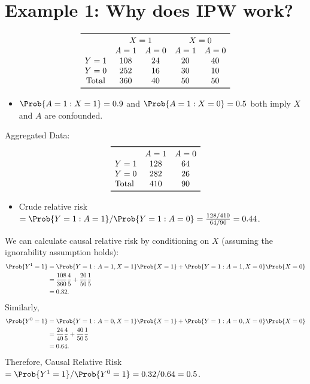 \documentclass[oneside]{book}\usepackage[]{graphicx}\usepackage[svgnames]{xcolor}
\providecommand\given{} %
\renewcommand\given{\nonscript\:\delimsize\vert\nonscript\:\mathopen{}}%
\renewcommand\given{\nonscript\:\delimsize\vert\nonscript\:\mathopen{}}%
\renewcommand\given{\nonscript\:\delimsize\vert\nonscript\:\mathopen{}}%
\renewcommand\given{\nonscript\:\delimsize\vert\nonscript\:\mathopen{}}%
\renewcommand\given{\nonscript\:\delimsize\vert\nonscript\:\mathopen{}}%
\renewcommand\given{\nonscript\:\delimsize\vert\nonscript\:\mathopen{}}%
\renewcommand\given{\nonscript\:\delimsize\vert\nonscript\:\mathopen{}}%
\renewcommand\given{\nonscript\:\delimsize\vert\nonscript\:\mathopen{}}%
\renewcommand\given{\nonscript\:\delimsize\vert\nonscript\:\mathopen{}}%
\renewcommand\given{\nonscript\:\delimsize\vert\nonscript\:\mathopen{}}%
\renewcommand\given{\nonscript\:\delimsize\vert\nonscript\:\mathopen{}}%
\renewcommand\given{\nonscript\:\delimsize\vert\nonscript\:\mathopen{}}%
\renewcommand\given{\nonscript\:\delimsize\vert\nonscript\:\mathopen{}}%
\renewcommand\given{\nonscript\:\delimsize\vert\nonscript\:\mathopen{}}%
\renewcommand\given{:}
\begin{document}
\section{Example 1: Why does IPW work?}
\[ \begin{array}{ccccc}
        \toprule
                     & \multicolumn{2}{c}{X=1} & \multicolumn{2}{c}{X=0}             \\
                     & A=1                     & A=0                     & A=1 & A=0 \\
        Y=1          & 108                     & 24                      & 20  & 40  \\
        Y=0          & 252                     & 16                      & 30  & 10  \\
        \text{Total} & 360                     & 40                      & 50  & 50  \\
        \bottomrule
    \end{array} \]
\begin{itemize}
    \item $ \Prob{A=1\given X=1}=0.9 $ and $ \Prob{A=1\given X=0}=0.5 $ both imply
          $ X $ and $ A $ are confounded.
\end{itemize}
Aggregated Data:
\[ \begin{array}{lcc}
        \toprule
                     & A=1 & A=0 \\
        Y=1          & 128 & 64  \\
        Y=0          & 282 & 26  \\
        \text{Total} & 410 & 90  \\
        \bottomrule
    \end{array} \]
\begin{itemize}
    \item Crude relative risk $ =\Prob{Y=1\given A=1}/\Prob{Y=1\given A=0}=\frac{128/410}{64/90}=0.44 $.
\end{itemize}
We can calculate causal relative risk by conditioning on $X$
(assuming the ignorability assumption holds):
\begin{align*}
    \Prob{Y^1=1}
     & =\Prob{Y=1\given A=1,X=1}\Prob{X=1}+\Prob{Y=1\given A=1,X=0}\Prob{X=0} \\
     & =\frac{108}{360}\frac{4}{5}+\frac{20}{50}\frac{1}{5}                   \\
     & =0.32.
\end{align*}
Similarly,
\begin{align*}
    \Prob{Y^0=1}
     & =\Prob{Y=1\given A=0,X=1}\Prob{X=1}+\Prob{Y=1\given A=0,X=0}\Prob{X=0} \\
     & =\frac{24}{40}\frac{4}{5}+\frac{40}{50}\frac{1}{5}                     \\
     & =0.64.
\end{align*}
Therefore, Causal Relative Risk $=\Prob{Y^1=1}/\Prob{Y^0=1}=0.32/0.64=0.5$.
\end{document}
